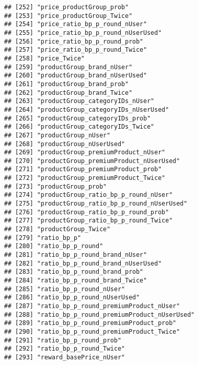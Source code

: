 \documentclass[10pt]{report}
\begin{document}
\begin{verbatim}
## [252] "price_productGroup_prob"                            
## [253] "price_productGroup_Twice"                           
## [254] "price_ratio_bp_p_round_nUser"                       
## [255] "price_ratio_bp_p_round_nUserUsed"                   
## [256] "price_ratio_bp_p_round_prob"                        
## [257] "price_ratio_bp_p_round_Twice"                       
## [258] "price_Twice"                                        
## [259] "productGroup_brand_nUser"                           
## [260] "productGroup_brand_nUserUsed"                       
## [261] "productGroup_brand_prob"                            
## [262] "productGroup_brand_Twice"                           
## [263] "productGroup_categoryIDs_nUser"                     
## [264] "productGroup_categoryIDs_nUserUsed"                 
## [265] "productGroup_categoryIDs_prob"                      
## [266] "productGroup_categoryIDs_Twice"                     
## [267] "productGroup_nUser"                                 
## [268] "productGroup_nUserUsed"                             
## [269] "productGroup_premiumProduct_nUser"                  
## [270] "productGroup_premiumProduct_nUserUsed"              
## [271] "productGroup_premiumProduct_prob"                   
## [272] "productGroup_premiumProduct_Twice"                  
## [273] "productGroup_prob"                                  
## [274] "productGroup_ratio_bp_p_round_nUser"                
## [275] "productGroup_ratio_bp_p_round_nUserUsed"            
## [276] "productGroup_ratio_bp_p_round_prob"                 
## [277] "productGroup_ratio_bp_p_round_Twice"                
## [278] "productGroup_Twice"                                 
## [279] "ratio_bp_p"                                         
## [280] "ratio_bp_p_round"                                   
## [281] "ratio_bp_p_round_brand_nUser"                       
## [282] "ratio_bp_p_round_brand_nUserUsed"                   
## [283] "ratio_bp_p_round_brand_prob"                        
## [284] "ratio_bp_p_round_brand_Twice"                       
## [285] "ratio_bp_p_round_nUser"                             
## [286] "ratio_bp_p_round_nUserUsed"                         
## [287] "ratio_bp_p_round_premiumProduct_nUser"              
## [288] "ratio_bp_p_round_premiumProduct_nUserUsed"          
## [289] "ratio_bp_p_round_premiumProduct_prob"               
## [290] "ratio_bp_p_round_premiumProduct_Twice"              
## [291] "ratio_bp_p_round_prob"                              
## [292] "ratio_bp_p_round_Twice"                             
## [293] "reward_basePrice_nUser"                             

\end{verbatim}
\end{document}
